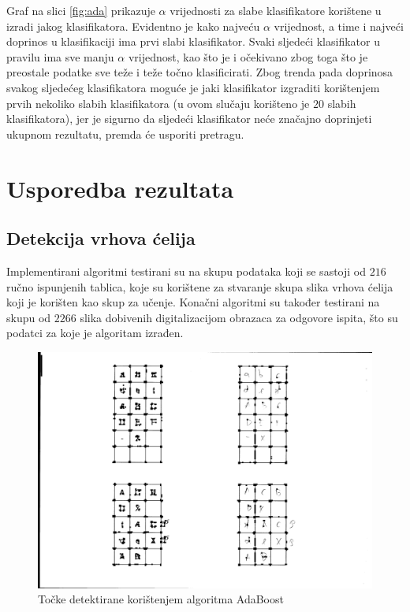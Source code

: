 \documentclass[times, utf8, zavrsni, numeric]{fer}
\begin{document}
Graf na slici \ref{fig:ada} prikazuje $\alpha$ vrijednosti za slabe klasifikatore korištene u izradi jakog klasifikatora. 
Evidentno je kako najveću $\alpha$ vrijednost, a time i najveći doprinos u klasifikaciji ima prvi slabi klasifikator. 
Svaki sljedeći klasifikator u pravilu ima sve manju $\alpha$ vrijednost, kao što je i očekivano zbog toga što je preostale podatke sve teže i teže točno klasificirati. 
Zbog trenda pada doprinosa svakog sljedećeg klasifikatora moguće je jaki klasifikator izgraditi korištenjem prvih nekoliko slabih klasifikatora (u ovom slučaju korišteno je $20$ slabih klasifikatora), jer je sigurno da sljedeći klasifikator neće značajno doprinjeti ukupnom rezultatu, premda će usporiti pretragu.

\section{Usporedba rezultata}

\subsection{Detekcija vrhova ćelija}
Implementirani algoritmi testirani su na skupu podataka koji se sastoji od $216$ ručno ispunjenih tablica, koje su korištene za stvaranje skupa slika vrhova ćelija koji je korišten kao skup za učenje.
Konačni algoritmi su također testirani na skupu od $2266$ slika dobivenih digitalizacijom obrazaca za odgovore ispita, što su podatci za koje je algoritam izrađen.

\begin{figure}[!ht]
    \centering
    \includegraphics[width=.75\linewidth]{Images/ada.png}
    \captionsetup{justification=centering}
    \caption{Točke detektirane korištenjem algoritma AdaBoost}
    \label{fig:adaResult}
\end{figure}
\end{document}
